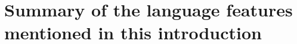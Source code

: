 \documentclass[11pt,a4paper]{article}
\begin{document}










\appendix

\section{Summary of the language features mentioned in this introduction}

\newpage




\end{document}
